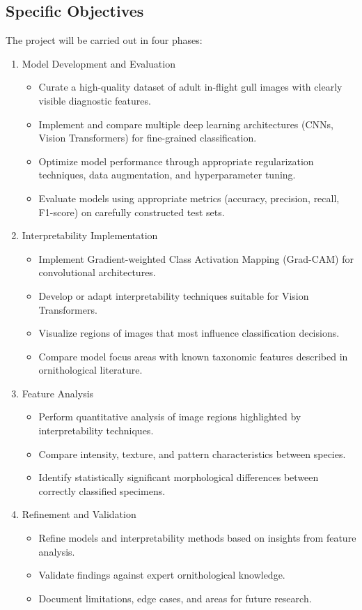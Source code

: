 \subsection*{Specific Objectives}
The project will be carried out in four phases:
\begin{enumerate}[label=Phase~\arabic*:]
    \item Model Development and Evaluation
        \begin{itemize}
            \item Curate a high-quality dataset of adult in-flight gull images with clearly visible diagnostic features.
            \item Implement and compare multiple deep learning architectures (CNNs, Vision Transformers) for fine-grained classification.
            \item Optimize model performance through appropriate regularization techniques, data augmentation, and hyperparameter tuning.
            \item Evaluate models using appropriate metrics (accuracy, precision, recall, F1-score) on carefully constructed test sets.
        \end{itemize}
    \item Interpretability Implementation
        \begin{itemize}
            \item Implement Gradient-weighted Class Activation Mapping (Grad-CAM) for convolutional architectures.
            \item Develop or adapt interpretability techniques suitable for Vision Transformers.
            \item Visualize regions of images that most influence classification decisions.
            \item Compare model focus areas with known taxonomic features described in ornithological literature.
        \end{itemize}
    \item Feature Analysis
        \begin{itemize}
            \item Perform quantitative analysis of image regions highlighted by interpretability techniques.
            \item Compare intensity, texture, and pattern characteristics between species.
            \item Identify statistically significant morphological differences between correctly classified specimens.
        \end{itemize}
    \item Refinement and Validation
        \begin{itemize}
            \item Refine models and interpretability methods based on insights from feature analysis.
            \item Validate findings against expert ornithological knowledge.
            \item Document limitations, edge cases, and areas for future research.
        \end{itemize}
\end{enumerate}